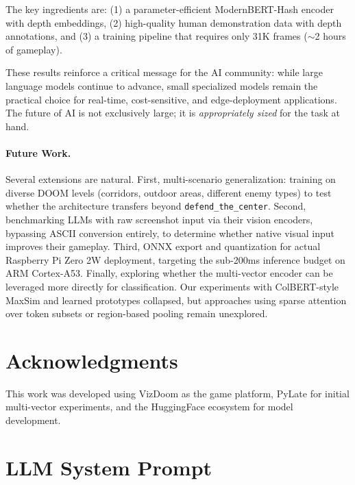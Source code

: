 \documentclass[11pt,a4paper]{article}
\begin{document}
The key ingredients are: (1) a parameter-efficient ModernBERT-Hash encoder with depth embeddings, (2) high-quality human demonstration data with depth annotations, and (3) a training pipeline that requires only 31K frames (${\sim}$2 hours of gameplay).

These results reinforce a critical message for the AI community: while large language models continue to advance, small specialized models remain the practical choice for real-time, cost-sensitive, and edge-deployment applications. The future of AI is not exclusively large; it is \textit{appropriately sized} for the task at hand.

\paragraph{Future Work.} Several extensions are natural. First, multi-scenario generalization: training on diverse DOOM levels (corridors, outdoor areas, different enemy types) to test whether the architecture transfers beyond \texttt{defend\_the\_center}. Second, benchmarking LLMs with raw screenshot input via their vision encoders, bypassing ASCII conversion entirely, to determine whether native visual input improves their gameplay. Third, ONNX export and quantization for actual Raspberry Pi Zero 2W deployment, targeting the sub-200ms inference budget on ARM Cortex-A53. Finally, exploring whether the multi-vector encoder can be leveraged more directly for classification. Our experiments with ColBERT-style MaxSim and learned prototypes collapsed, but approaches using sparse attention over token subsets or region-based pooling remain unexplored.

\section*{Acknowledgments}

This work was developed using VizDoom \citep{wydmuch2019vizdoom} as the game platform, PyLate for initial multi-vector experiments, and the HuggingFace ecosystem for model development.




\appendix
\section{LLM System Prompt}
\label{app:prompt}
\end{document}
